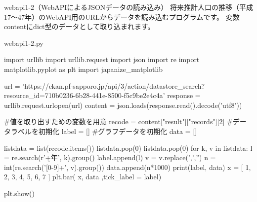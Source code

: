 \begin{pabox}{webapi1-2（WebAPIによるJSONデータの読み込み）}
将来推計人口の推移（平成17～47年）のWebAPI用のURLからデータを読み込むプログラムです。
変数contentにdict型のデータとして取り込まれます。
\begin{legbox}{webapi1-2.py}
\begin{listing}{1}
import urllib
import urllib.request
import json
import re
import matplotlib.pyplot as plt
import japanize_matplotlib

url = 'https://ckan.pf-sapporo.jp/api/3/action/datastore_search?resource_id=710b0236-6b28-441e-8500-f5c9be2e4c4a'
response = urllib.request.urlopen(url)
content = json.loads(response.read().decode('utf8'))

#値を取り出すための変数を用意
recode = content["result"]["records"][2]
#データラベルを初期化
label = []
#グラフデータを初期化
data = []

listdata = list(recode.items()) 
listdata.pop(0)
listdata.pop(0)
for k, v in listdata:
    l = re.search(r'\d+年', k).group()
    label.append(l)
    v = v.replace(',','')
    n = int(re.search('[0-9]+', v).group())
    data.append(n*1000)
print(label, data)
x = [ 1, 2, 3, 4, 5, 6, 7 ]
plt.bar( x, data ,tick_label = label)

plt.show()
\end{listing}
\end{legbox}
\end{pabox}
